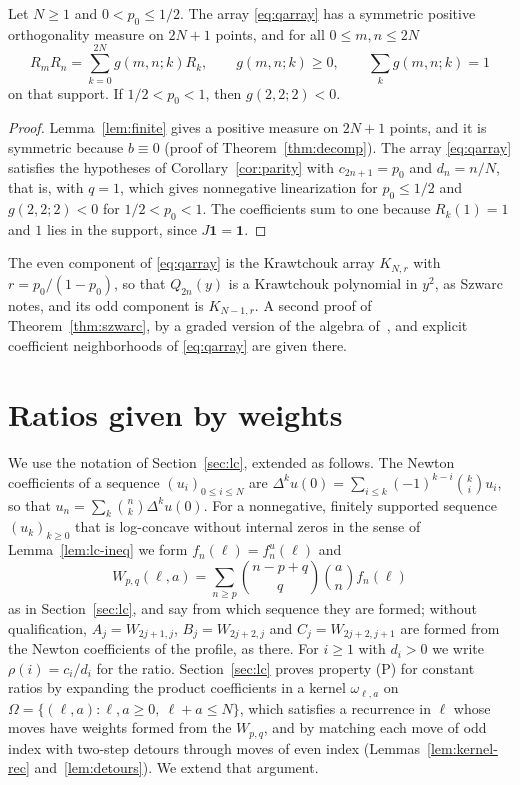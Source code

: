 \begin{theorem}\label{thm:szwarc}
Let $N\geq1$ and $0<p_0\leq1/2$. The array \eqref{eq:qarray} has a symmetric positive orthogonality measure on $2N+1$ points, and for all $0\leq m,n\leq 2N$
\[
R_mR_n=\sum_{k=0}^{2N}g(m,n;k)R_k,\qquad g(m,n;k)\geq0,\qquad\sum_k g(m,n;k)=1
\]
on that support. If $1/2<p_0<1$, then $g(2,2;2)<0$.
\end{theorem}
\begin{proof}
Lemma~\ref{lem:finite} gives a positive measure on $2N+1$ points, and it is symmetric because $b\equiv0$ (proof of Theorem~\ref{thm:decomp}). The array \eqref{eq:qarray} satisfies the hypotheses of Corollary~\ref{cor:parity} with $c_{2n+1}=p_0$ and $d_n=n/N$, that is, with $q=1$, which gives nonnegative linearization for $p_0\leq1/2$ and $g(2,2;2)<0$ for $1/2<p_0<1$. The coefficients sum to one because $R_k(1)=1$ and $1$ lies in the support, since $J\boldsymbol1=\boldsymbol1$.
\end{proof}

The even component of \eqref{eq:qarray} is the Krawtchouk array $K_{N,r}$ with $r=p_0/(1-p_0)$, so that $Q_{2n}(y)$ is a Krawtchouk polynomial in $y^2$, as Szwarc notes, and its odd component is $K_{N-1,r}$. A second proof of Theorem~\ref{thm:szwarc}, by a graded version of the algebra of~\cite{P3}, and explicit coefficient neighborhoods of \eqref{eq:qarray} are given there.

\section{Ratios given by weights}\label{sec:vary}

We use the notation of Section~\ref{sec:lc}, extended as follows. The Newton coefficients of a sequence $(u_i)_{0\leq i\leq N}$ are $\Delta^ku(0)=\sum_{i\leq k}(-1)^{k-i}\binom kiu_i$, so that $u_n=\sum_k\binom nk\Delta^ku(0)$. For a nonnegative, finitely supported sequence $(u_k)_{k\geq0}$ that is log-concave without internal zeros in the sense of Lemma~\ref{lem:lc-ineq} we form $f_n(\ell)=f^u_n(\ell)$ and
\[
W_{p,q}(\ell,a)=\sum_{n\geq p}\binom{n-p+q}q\binom anf_n(\ell)
\]
as in Section~\ref{sec:lc}, and say from which sequence they are formed; without qualification, $A_j=W_{2j+1,j}$, $B_j=W_{2j+2,j}$ and $C_j=W_{2j+2,j+1}$ are formed from the Newton coefficients of the profile, as there. For $i\geq1$ with $d_i>0$ we write $\rho(i)=c_i/d_i$ for the ratio. Section~\ref{sec:lc} proves property (P) for constant ratios by expanding the product coefficients in a kernel $\omega_{\ell,a}$ on $\Omega=\{(\ell,a):\ell,a\geq0,\ \ell+a\leq N\}$, which satisfies a recurrence in $\ell$ whose moves have weights formed from the $W_{p,q}$, and by matching each move of odd index with two-step detours through moves of even index (Lemmas~\ref{lem:kernel-rec} and~\ref{lem:detours}). We extend that argument.

